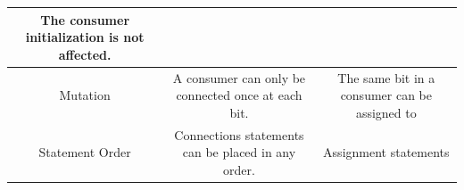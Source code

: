 \begin{table}[t]
\begin{tabular}{|c|c|c|}
\begin{minipage}[c][0.5cm]{0.42\textwidth}
      The consumer initialization is \textbf{not} affected.
    \end{minipage} 
    \\ 
    \hline
    \begin{minipage}{0.1\textwidth}
      \flushleft
      Mutation
    \end{minipage} 
    &
    \begin{minipage}[c][0.5cm]{0.42\textwidth}
      A consumer can only be connected once at each bit.
    \end{minipage} 
    &  
    \begin{minipage}[c][0.5cm]{0.42\textwidth}
      The same bit in a consumer can be assigned to 
    \end{minipage} 
    \\ 
    \hline
    \begin{minipage}{0.1\textwidth}
      \flushleft
      Statement Order
    \end{minipage} 
    &
    \begin{minipage}[c][0.8cm]{0.42\textwidth}
      Connections statements can be placed in any order.
    \end{minipage} 
    &  
    \begin{minipage}[c][0.8cm]{0.42\textwidth}
      Assignment statements
    \end{minipage} 
    \\ 
    \hline
  \end{tabular} 
\end{table}

